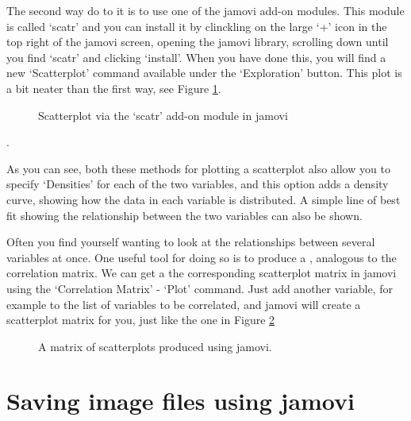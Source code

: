 The second way do to it is to use one of the jamovi add-on modules. This module is called `scatr' and you can install it by clinckling on the large `+' icon in the top right of the jamovi screen, opening the jamovi library, scrolling down until you find `scatr' and clicking `install'. When you have done this, you will find a new `Scatterplot' command available under the `Exploration' button. This plot is a bit neater than the first way, see Figure \ref{fig:scatterplot2}.

\begin{figure}[h!!]
\begin{center}
\caption{Scatterplot via the `scatr' add-on module in jamovi}
\label{fig:scatterplot2}
\HR
\end{center}
\end{figure}. 

As you can see, both these methods for plotting a scatterplot also allow you to specify `Densities' for each of the two variables, and this option adds a density curve, showing how the data in each variable is distributed. A simple line of best fit showing the relationship between the two variables can also be shown. 


Often you find yourself wanting to look at the relationships between several variables at once. One useful tool for doing so is to produce a , analogous to the correlation matrix. We can get a the corresponding scatterplot matrix in jamovi using the `Correlation Matrix' - `Plot' command. Just add another variable, for example  to the list of variables to be correlated, and jamovi will create a scatterplot matrix for you, just like the one in Figure \ref{fig:scatterplot3}


\begin{figure}[h]
\begin{center}
\caption{A matrix of scatterplots produced using jamovi.}
\HR
\label{fig:scatterplot3}
\end{center}
\end{figure}


\section{Saving image files using jamovi~\label{sec:saveimage}}

